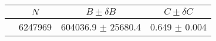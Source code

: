 \begin{tabular}{lccc}
\hline
    &   $N$   & $B \pm \delta B$  &  $C \pm \delta C$ \\
\hline
                               & 6247969    & 604036.9   $\pm$ 25680.4 & 0.649      $\pm$ 0.004 \\
\hline
\end{tabular}
